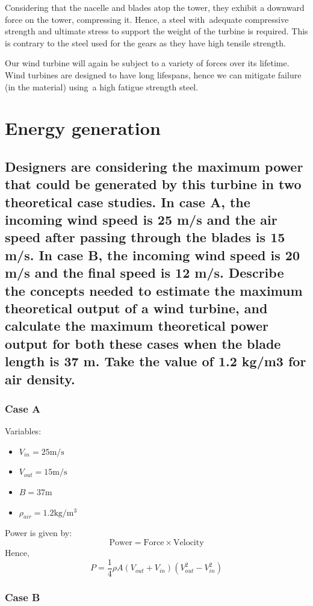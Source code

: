 \documentclass[12pt]{article}
\numberwithin{equation}{section}
\begin{document}
\begin{flushleft}
Considering that the nacelle and blades atop the tower, they exhibit a downward force on the tower, compressing it. Hence, a steel with adequate compressive strength and ultimate stress to support the weight of the turbine is required. This is contrary to the steel used for the gears as they have high tensile strength. 

Our wind turbine will again be subject to a variety of forces over its lifetime. Wind turbines are designed to have long lifespans, hence we can mitigate failure (in the material) using a high fatigue strength steel.  

\section{Energy generation}
\subsection{Designers are considering the maximum power that could be generated by this turbine in two theoretical case studies. In case A, the incoming wind speed is 25 m/s and the air speed after passing through the blades is 15 m/s. In case B, the incoming wind speed is 20 m/s and the final speed is 12 m/s. Describe the concepts needed to estimate the maximum theoretical output of a wind turbine, and calculate the maximum theoretical power output for both these cases when the blade length is 37 m. Take the value of 1.2 kg/m3 for air density.}
\subsubsection{Case A}
Variables:
\begin{itemize}
  \item $V_{in} = 25\si{\meter\per\second}$
  \item $V_{out} = 15\si{\meter\per\second}$
  \item $B = 37\si{\meter}$
  \item $\rho_{air} = 1.2\si{\kg\per\meter\cubed}$
\end{itemize}
Power is given by:
\begin{equation}
  \textrm{Power} = \textrm{Force} \times \textrm{Velocity}
\end{equation}
Hence,
\begin{equation}
  P = \frac{1}{4} \rho A (V_{out} + V_{in})(V_{out}^2 - V_{in}^2)
\end{equation}
\subsubsection{Case B}


\end{flushleft}
\end{document}
